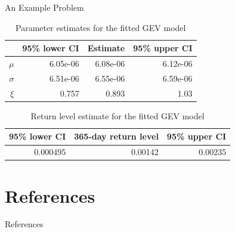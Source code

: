 \documentclass{beamer}
\begin{document}
\begin{frame}{An Example Problem}
    \begin{table}[ht]
        \centering
        \begin{tabular}{rrrr}
            \hline
            & 95\% lower CI & Estimate & 95\% upper CI \\ 
            \hline
            $\mu$ & 6.05e-06 & 6.08e-06 & 6.12e-06 \\ 
            $\sigma$ & 6.51e-06 & 6.55e-06 & 6.59e-06 \\ 
            $\xi$ & 0.757 & 0.893 & 1.03 \\ 
            \hline
        \end{tabular}
        \caption{Parameter estimates for the fitted GEV model} 
        \label{tbl:daily_max_flux_theta_hat}
    \end{table}

    \begin{table}[ht]
        \centering
        \begin{tabular}{rrr}
            \hline
            95\% lower CI & 365-day return level & 95\% upper CI \\
            \hline
            0.000495 & 0.00142 & 0.00235 \\
            \hline
        \end{tabular}
        \caption{Return level estimate for the fitted GEV model} 
        \label{tbl:daily_max_flux_r_hat}
    \end{table}
\end{frame}

\section{References}

\begin{frame}[allowframebreaks]{References}
    \nocite{*}
    \printbibliography
\end{frame}
\end{document}
